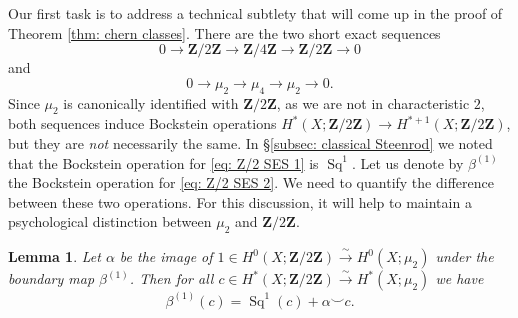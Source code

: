 \documentclass[10pt, reqno]{amsart}
\numberwithin{equation}{subsection}
\newcommand{\Z}{\mathbf{Z}}
\DeclareMathOperator{\et}{\acute{e}t}
\DeclareMathOperator{\Sq}{Sq}
\newtheorem{lemma}[thm]{Lemma}
\theoremstyle{remark}
\begin{document}
Our first task is to address a technical subtlety that will come up in the proof of Theorem \ref{thm: chern classes}. There are the two short exact sequences
\begin{equation}\label{eq: Z/2 SES 1}
0 \rightarrow \Z/2\Z \rightarrow \Z/4\Z \rightarrow \Z/2\Z \rightarrow 0
\end{equation}
and 
\begin{equation}\label{eq: Z/2 SES 2}
0 \rightarrow \mu_2 \rightarrow \mu_4 \rightarrow \mu_2 \rightarrow 0.
\end{equation}
Since $\mu_2$ is canonically identified with $\Z/2\Z$, as we are not in characteristic $2$, both sequences induce Bockstein operations $H^*_{\et}(X; \Z/2\Z) \rightarrow H^{*+1}_{\et}(X; \Z/2\Z)$, but they are \emph{not} necessarily the same. In \S \ref{subsec: classical Steenrod} we noted that the Bockstein operation for \eqref{eq: Z/2 SES 1} is $\Sq^1$. Let us denote by $\beta^{(1)}$ the Bockstein operation for \eqref{eq: Z/2 SES 2}. We need to quantify the difference between these two operations. For this discussion, it will help to maintain a psychological distinction between $\mu_2$ and $\Z/2\Z$. 

\begin{lemma}\label{lemma: boundary difference}
Let $\alpha$ be the image of $1 \in H^0_{\et}(X; \Z/2\Z) \xrightarrow{\sim} H^0_{\et}(X; \mu_2)$ under the boundary map $\beta^{(1)}$. Then for all $c \in H^*_{\et}(X; \Z/2\Z) \xrightarrow{\sim} H^*_{\et}(X; \mu_2)$ we have
\[
\beta^{(1)}(c) = \Sq^1(c) +  \alpha \smile c.
\]
\end{lemma}
\end{document}
